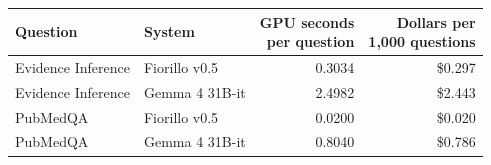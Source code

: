 \begin{tabular}{llrr}
\toprule
Question & System & \shortstack{GPU seconds\\ per question} & \shortstack{Dollars per\\ 1,000 questions} \\
\midrule
Evidence Inference & Fiorillo v0.5 & 0.3034 & \$0.297 \\[2pt]
Evidence Inference & Gemma 4 31B-it & 2.4982 & \$2.443 \\[2pt]
PubMedQA & Fiorillo v0.5 & 0.0200 & \$0.020 \\[2pt]
PubMedQA & Gemma 4 31B-it & 0.8040 & \$0.786 \\[2pt]
\bottomrule
\end{tabular}
